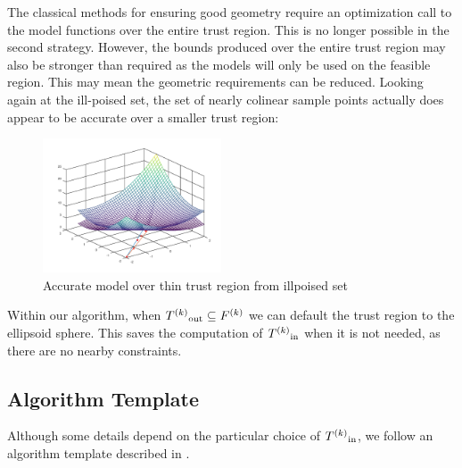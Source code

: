 The classical methods for ensuring good geometry require an optimization call to the model functions over the entire trust region.
This is no longer possible in the second strategy.
However, the bounds produced over the entire trust region may also be stronger than required as the models will only be used on the feasible region.
This may mean the geometric requirements can be reduced.
Looking again at the ill-poised set, the set of nearly colinear sample points actually does appear to be accurate over a smaller trust region:


\begin{figure}[h]
    \centering
    \includegraphics[width=200px]{images/poised_bad_but_good.png}
    \caption{Accurate model over thin trust region from illpoised set}
    \label{aoip}
\end{figure}


Within our algorithm, when $ {T^{(k)}}_{\text{out}} \subseteq {F}^{(k)}$ we can default the trust region to the ellipsoid sphere.
This saves the computation of ${T^{(k)}}_{\text{in}}$ when it is not needed, as there are no nearby constraints.

\subsection{Algorithm Template}

Although some details depend on the particular choice of ${T^{(k)}}_{\text{in}}$, we follow an algorithm template described in \cite{doi:10.1080/10556788.2015.1026968}.



